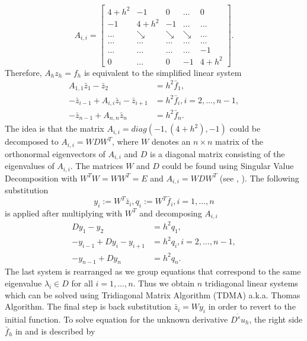 \documentclass[11pt,a4paper,twoside]{article}
\begin{document}
\[
A_{i,i} = 
\begin{bmatrix}
    4+h^2       & -1          &  0              & \dots & 0 \\
    -1               & 4+h^2  & -1              & \dots & \dots  \\
      \dots         & \searrow     & \searrow  & \searrow  & \dots  \\
      \dots         & \dots     & \dots         & \dots   &    \dots  \\
      \dots         & \dots    & \dots         & \dots & -1  \\
     0                 & \dots   &  0               & -1    & 4+h^2
\end{bmatrix}
.
\]
Therefore, $A_h z_h = f_h$ is equivalent to the simplified linear system
\begin{align}
A_{1,1}\bar z_1 - \bar z_2 &= h^2\bar f_1, \nonumber \\
- \bar z_{i-1}  + A_{i,i}\bar z_i - \bar z_{i+1}  &= h^2\bar f_i, i = 2,...,n-1, \nonumber \\
- \bar z_{n-1} + A_{n,n}\bar z_n &= h^2\bar f_n.\label{LinSys}
\end{align}
The idea is that the matrix $A_{i,i} = diag(-1, (4+h^2), -1)$ could be decomposed to $A_{i,i}  = W D W^T$, where $W$ denotes an $n \times n$ matrix of the orthonormal eigenvectors of $A_{i,i} $ and $ D$ is a diagonal matrix consisting of the eigenvalues of $A_{i,i}$. The matrices $W$ and $D$ could be found using Singular Value Decomposition with $W^T W = W W^T = E$ and $A_{i,i} = WDW^T$ (see \cite{Tref}, \cite{FPS}). The following substitution 
\begin{equation}\label{subst}
y_i := W^T \bar z_i, q_i := W^T \bar f_i, i = 1, ...,n
\end{equation}
is applied after multiplying  with $W^T$ and decomposing $A_{i,i}$
\begin{align}
Dy_1 - y_2 &= h^2 q_1,\nonumber \\
-y_{i-1} + D y_i - y_{i+1} &= h^2 q_i, i = 2,...,n-1,\nonumber \\
- y_{n-1} + Dy_n &= h^2 q_n.\label{SubSys}
\end{align}
The last system  is rearranged as we group equations that correspond to the same eigenvalue $\lambda_i \in D$ for all $i = 1,...,n$. Thus we obtain $n$ tridiagonal linear systems which can be solved using Tridiagonal Matrix Algorithm (TDMA) a.k.a. Thomas Algorithm. The final step is back substitution $\bar z_i = W y_i$ in order to revert to the initial function. To solve equation  for the unknown derivative $D^{\tilde s}u_h$, the right side $\bar f_h$  in  and  is described by
\end{document}
